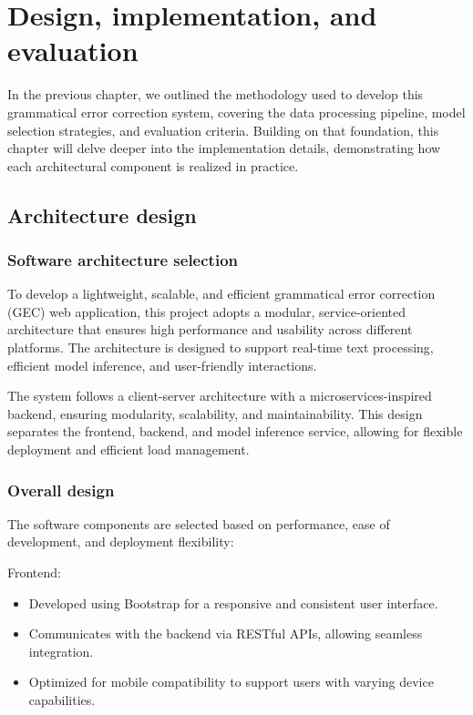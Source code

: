 \chapter{Design, implementation, and evaluation}

In the previous chapter, we outlined the methodology used to develop this grammatical error correction system, covering the data processing pipeline, model selection strategies, and evaluation criteria.
Building on that foundation, this chapter will delve deeper into the implementation details, demonstrating how each architectural component is realized in practice.

\section{Architecture design}

\subsection{Software architecture selection}

To develop a lightweight, scalable, and efficient grammatical error correction (GEC) web application, this project adopts a modular, service-oriented architecture that ensures high performance and usability across different platforms.
The architecture is designed to support real-time text processing, efficient model inference, and user-friendly interactions.

The system follows a client-server architecture with a microservices-inspired backend, ensuring modularity, scalability, and maintainability.
This design separates the frontend, backend, and model inference service, allowing for flexible deployment and efficient load management.

\subsection{Overall design}

The software components are selected based on performance, ease of development, and deployment flexibility:

Frontend:

\begin{itemize}
  \item Developed using Bootstrap for a responsive and consistent user interface.
  \item Communicates with the backend via RESTful APIs, allowing seamless integration.
  \item Optimized for mobile compatibility to support users with varying device capabilities.
\end{itemize}

